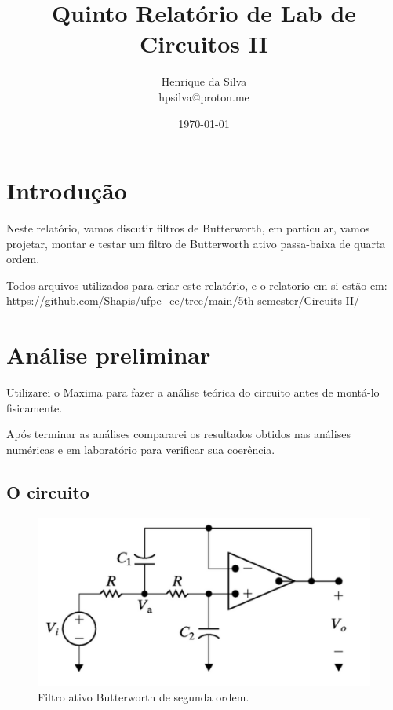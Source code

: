 \documentclass[12pt,twoside, a4paper, twocolumn]{article}
\title{Quinto Relatório de Lab de Circuitos II}
\author{Henrique da Silva \\ hpsilva@proton.me}
\date{\today}
\begin{document}
\maketitle
{}
\newpage
\tableofcontents
\newpage


\section{Introdução}

Neste relatório, vamos discutir filtros de Butterworth, em particular, vamos projetar, montar e testar um filtro de Butterworth ativo passa-baixa de quarta ordem.

Todos arquivos utilizados para criar este relatório, e o relatorio em si estão em:  \url{https://github.com/Shapis/ufpe_ee/tree/main/5th semester/Circuits II/}

\section{Análise preliminar}

Utilizarei o Maxima para fazer a análise teórica do circuito antes de montá-lo fisicamente.

Após terminar as análises compararei os resultados obtidos nas análises numéricas e em laboratório para verificar sua coerência.

\subsection{O circuito}

\begin{figure}[h]
    \centering
    \includegraphics[width=1\columnwidth]{images/circuito.png}
    \caption{Filtro ativo Butterworth de segunda ordem.}
\end{figure}
\end{document}
